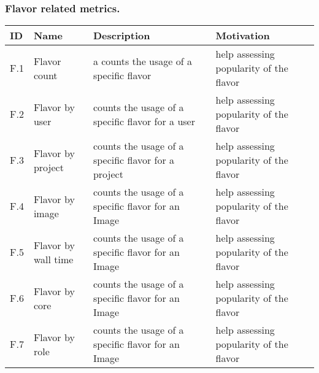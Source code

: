 \documentclass{beamer}
\newcommand{\eTABLE}{\end{tabular}
\end{center}
\end{scriptsize}
}
\newcommand{\bTABLE}[2]{
\frametitle{#1}
\bigskip
\begin{scriptsize}
\begin{center}
\begin{tabular}{lp{0.15\textwidth}p{0.3\textwidth}p{0.4\textwidth}}
\hline
\rowcolor{blue!20} \bf ID & \bf Name & \bf Description & \bf Motivation \\
\hline}
\newenvironment{METRICTABLE}[2] {\bTABLE{#1}{#2}}{\eTABLE}
\begin{document}
\begin{frame}[shrink]
\begin{METRICTABLE}{Flavor related metrics.}{T:flavor}
F.1 & Flavor count& a counts the usage of a specific flavor & help assessing popularity of the flavor \\ \hline
F.2 & Flavor by user & counts the usage of a specific flavor for a user & help assessing popularity of the flavor \\ \hline 
F.3 & Flavor by project & counts the usage of a specific flavor for a project & help assessing popularity of the flavor \\ \hline 
F.4 & Flavor by image & counts the usage of a specific flavor for an Image  & help assessing popularity of the flavor \\ \hline 
F.5 & Flavor by wall time & counts the usage of a specific flavor for an Image  & help assessing popularity of the flavor \\ \hline 
F.6 & Flavor by core & counts the usage of a specific flavor for an Image  & help assessing popularity of the flavor \\ \hline 
F.7 & Flavor by role & counts the usage of a specific flavor for an Image  & help assessing popularity of the flavor \\ \hline 
\end{METRICTABLE}
\end{frame}
\end{document}
